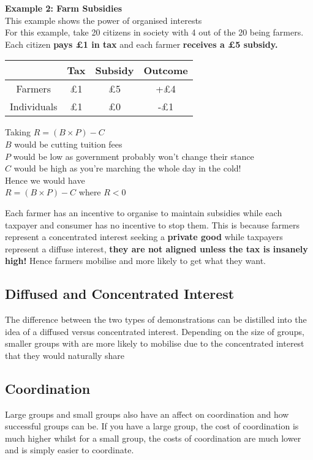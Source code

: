 \documentclass[12pt, letterpaper]{article}
\begin{document}
\begin{center}
\textbf{Example 2: Farm Subsidies} \\
This example shows the power of organised interests \\
For this example, take 20 citizens in society with 4 out of the 20 being farmers. Each citizen \textbf{pays £1 in tax} and each farmer \textbf{receives a £5 subsidy.}

\begin{center}
\begin{tabular}{|c|c|c|c|}

	\hline
	& Tax & Subsidy & Outcome \\
	\hline
	\hline
	Farmers & £1 & £5 & +£4 \\
	\hline
	Individuals & £1 & £0 & -£1 \\
	\hline

\end{tabular}
\end{center}

Taking $R=(B \times P) - C$ \\
$B$ would be cutting tuition fees \\
$P$ would be low as government probably won't change their stance \\
$C$ would be high as you're marching the whole day in the cold! \\
Hence we would have \\
$R=(B \times P) - C$ where $R<0$
\end{center}

Each farmer has an incentive to organise to maintain subsidies while each taxpayer and consumer has no incentive to stop them. This is because farmers represent a concentrated interest seeking a \textbf{private good} while taxpayers represent a diffuse interest, \textbf{they are not aligned unless the tax is insanely high!} Hence farmers mobilise and more likely to get what they want.

\subsection{Diffused and Concentrated Interest}
The difference between the two types of demonstrations can be distilled into the idea of a diffused versus concentrated interest. Depending on the size of groups, smaller groups with are more likely to mobilise due to the concentrated interest that they would naturally share

\subsection{Coordination}
Large groups and small groups also have an affect on coordination and how successful groups can be. If you have a large group, the cost of coordination is much higher whilst for a small group, the costs of coordination are much lower and is simply easier to coordinate.
\end{document}
